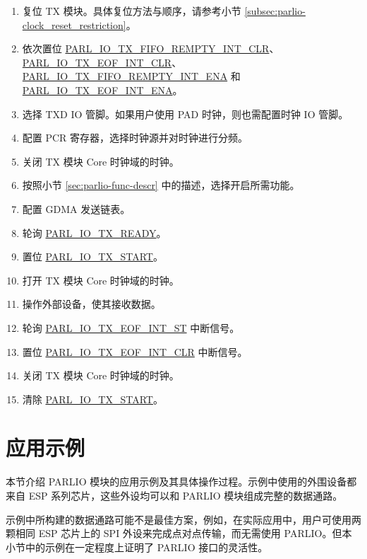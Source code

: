 \documentclass[main\_\_CN.tex]{subfiles}
\begin{document}
\begin{enumerate}
    \item 复位 TX 模块。具体复位方法与顺序，请参考小节 \ref{subsec:parlio-clock_reset_restriction}。
    \item 依次置位 \hyperref[fielddesc:PARLIOTXFIFOREMPTYINTCLR]{PARL\_IO\_TX\_FIFO\_REMPTY\_INT\_CLR}、\hyperref[fielddesc:PARLIOTXEOFINTCLR]{PARL\_IO\_TX\_EOF\_INT\_CLR}、\hyperref[fielddesc:PARLIOTXFIFOREMPTYINTENA]{PARL\_IO\_TX\_FIFO\_REMPTY\_INT\_ENA} 和 \hyperref[fielddesc:PARLIOTXEOFINTENA]{PARL\_IO\_TX\_EOF\_INT\_ENA}。
    \item 选择 TXD IO 管脚。如果用户使用 PAD 时钟，则也需配置时钟 IO 管脚。
    \item 配置 PCR 寄存器，选择时钟源并对时钟进行分频。
    \item 关闭 TX 模块 Core 时钟域的时钟。
    \item 按照小节 \ref{sec:parlio-func-descr} 中的描述，选择开启所需功能。
    \item 配置 GDMA 发送链表。
    \item 轮询 \hyperref[fielddesc:PARLIOTXREADY]{PARL\_IO\_TX\_READY}。
    \item 置位 \hyperref[fielddesc:PARLIOTXSTART]{PARL\_IO\_TX\_START}。
    \item 打开 TX 模块 Core 时钟域的时钟。
    \item 操作外部设备，使其接收数据。
    \item 轮询 \hyperref[fielddesc:PARLIOTXEOFINTST]{PARL\_IO\_TX\_EOF\_INT\_ST} 中断信号。
    \item 置位 \hyperref[fielddesc:PARLIOTXEOFINTCLR]{PARL\_IO\_TX\_EOF\_INT\_CLR} 中断信号。
    \item 关闭 TX 模块 Core 时钟域的时钟。
    \item 清除 \hyperref[fielddesc:PARLIOTXSTART]{PARL\_IO\_TX\_START}。
\end{enumerate}


\section{应用示例}
\label{sec:parlio-application-example}

本节介绍 PARLIO 模块的应用示例及其具体操作过程。示例中使用的外围设备都来自 ESP 系列芯片，这些外设均可以和 PARLIO 模块组成完整的数据通路。

\begin{tiplisting}
示例中所构建的数据通路可能不是最佳方案，例如，在实际应用中，用户可使用两颗相同 ESP 芯片上的 SPI 外设来完成点对点传输，而无需使用 PARLIO。但本小节中的示例在一定程度上证明了 PARLIO 接口的灵活性。\end{tiplisting}
\end{document}
